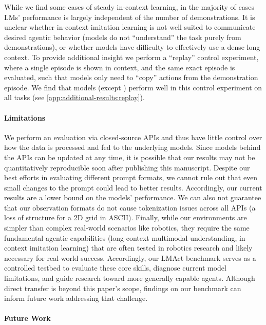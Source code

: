 While we find some cases of steady in-context learning, in the majority of cases LMs' performance is largely independent of the number of demonstrations. 
It is unclear whether in-context imitation learning is not well suited to communicate desired agentic behavior (\ie models do not ``understand'' the task purely from demonstrations), or whether models have difficulty to effectively use a dense long context.
To provide additional insight we perform a ``replay'' control experiment, where a single episode is shown in context, and the same exact episode is evaluated, such that models only need to ``copy'' actions from the demonstration episode.
We find that models (except \mini{}) perform well in this control experiment on all tasks (see \cref{app:additional-results:replay}).

\vspace{-8pt}
\paragraph{Limitations}

We perform an evaluation via closed-source APIs and thus have little control over how the data is processed and fed to the underlying models.
Since models behind the APIs can be updated at any time, it is possible that our results may not be quantitatively reproducible soon after publishing this manuscript.
Despite our best efforts in evaluating different prompt formats, we cannot rule out that even small changes to the prompt could lead to better results.
Accordingly, our current results are a lower bound on the models' performance.
We can also not guarantee that our observation formats do not cause tokenization issues across all APIs (\eg a loss of structure for a 2D grid in ASCII).
Finally, while our environments are simpler than complex real-world scenarios like robotics, they require the same fundamental agentic capabilities (long-context multimodal understanding, in-context imitation learning) that are often tested in robotics research and likely necessary for real-world success.
Accordingly, our LMAct benchmark serves as a controlled testbed to evaluate these core skills, diagnose current model limitations, and guide research toward more generally capable agents.
Although direct transfer is beyond this paper's scope, findings on our benchmark can inform future work addressing that challenge.

\vspace{-8pt}
\paragraph{Future Work}

